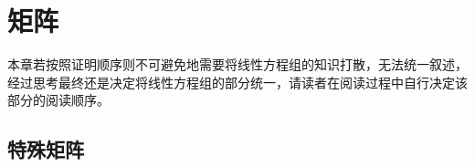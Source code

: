 \chapter{矩阵}

本章若按照证明顺序则不可避免地需要将线性方程组的知识打散，无法统一叙述，经过思考最终还是决定将线性方程组的部分统一，请读者在阅读过程中自行决定该部分的阅读顺序。









\section{特殊矩阵}
